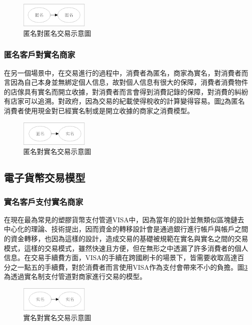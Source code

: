 		\begin{figure}[!htbp]
			\centering
			\includegraphics[width = 0.3\textwidth]{modeaa.png}
			\caption{匿名對匿名交易示意圖}\label{modeaa}
		\end{figure}

		\subsubsection{匿名客戶對實名商家}
		在另一個場景中，在交易進行的過程中，消費者為匿名，商家為實名，對消費者而言因為自己本身並無綁定個人信息，故對個人信息有很大的保障，消費者消費物件的店傢具有實名而開立收據，對消費者而言會得到消費記錄的保障，對消費的糾紛有店家可以追溯。對政府，因為交易的紀載使得稅收的計算變得容易。圖\ref{modean}為匿名消費者使用現金對已經實名制或是開立收據的商家之消費模型。

		\begin{figure}[!htbp]
			\centering
			\includegraphics[width = 0.3\textwidth]{modean.png}
			\caption{匿名對實名交易示意圖}\label{modean}
		\end{figure}

	\subsection{電子貨幣交易模型}

		\subsubsection{實名客戶支付實名商家}
		在現在最為常見的塑膠貨幣支付管道VISA中，因為當年的設計並無類似區塊鏈去中心化的理論、技術提出，因而資金的轉移設計會是通過銀行進行帳戶與帳戶之間的資金轉移，也因為這樣的設計，造成交易的基礎被規範在實名與實名之間的交易模式，這樣的交易模式，雖然快速且方便，但在無形之中透漏了許多消費者的個人信息。在交易手續費方面，VISA的手續在跨國刷卡的場景下，皆需要收取高達百分之一點五的手續費，對於消費者而言使用VISA作為支付會帶來不小的負擔。圖\ref{modenn}為透過實名制支付管道對商家進行交易的模型。

		\begin{figure}[!htbp]
			\centering
			\includegraphics[width = 0.3\textwidth]{modenn.png}
			\caption{實名對實名交易示意圖}\label{modenn}
		\end{figure}

